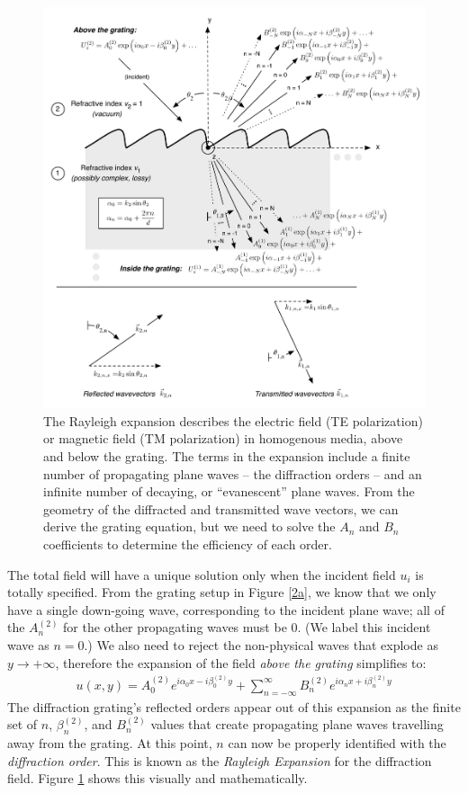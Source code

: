 \begin{figure}[htbp] %
   \centering
   \includegraphics[scale=0.8]{../data/Chapter2/2b_rayleighExpansion/2b.pdf} 
   \caption{The Rayleigh expansion describes the electric field (TE polarization) or magnetic field (TM polarization) in homogenous media, above and below the grating.  The terms in the expansion include a finite number of propagating plane waves -- the diffraction orders -- and an infinite number of decaying, or ``evanescent'' plane waves. From the geometry of the diffracted and transmitted wave vectors, we can derive the grating equation, but we need to solve the $A_n$ and $B_n$ coefficients to determine the efficiency of each order. }
   \label{2b}
\end{figure}

The total field will have a unique solution only when the incident field $u_i$ is totally specified.  From the grating setup in Figure \ref{2a}, we know that we only have a single down-going wave, corresponding to the incident plane wave; all of the $A^{(2)}_n$ for the other propagating waves must be 0.  (We label this incident wave as $n=0$.)  We also need to reject the non-physical waves that explode as $y \rightarrow +\infty$, therefore the expansion of the field \emph{above the grating} simplifies to:
\begin{eqnarray}
u(x,y) =  A^{(2)}_0 e^{i \alpha_0 x - i \beta^{(2)}_0 y} +  \sum_{n=-\infty}^{\infty} B^{(2)}_n e^{i \alpha_n x + i \beta^{(2)}_n y}
\label{rayleighExp2}
\end{eqnarray}
The diffraction grating's reflected orders appear out of this expansion as the finite set of $n$, $\beta^{(2)}_n$, and $B^{(2)}_n$ values that create propagating plane waves travelling away from the grating.  At this point, $n$ can now be properly identified with the \emph{diffraction order}.  This is known as the \emph{Rayleigh Expansion} for the diffraction field.  Figure \ref{2b} shows this visually and mathematically. 

